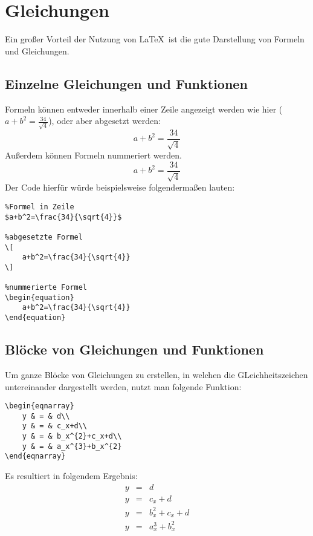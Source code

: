 
\chapter{Gleichungen}
Ein großer Vorteil der Nutzung von \LaTeX\ ist die gute Darstellung von Formeln und Gleichungen. 
\section{Einzelne Gleichungen und Funktionen}
Formeln können entweder innerhalb einer Zeile angezeigt werden wie hier ($a+b^2=\frac{34}{\sqrt{4}}$), oder aber abgesetzt werden:
\[
    a+b^2=\frac{34}{\sqrt{4}}
\]
Außerdem können Formeln nummeriert werden.
\begin{equation}
    a+b^2=\frac{34}{\sqrt{4}}
\end{equation}
Der Code hierfür würde beispielsweise folgendermaßen lauten:
\begin{lstlisting}
%Formel in Zeile
$a+b^2=\frac{34}{\sqrt{4}}$

%abgesetzte Formel
\[
    a+b^2=\frac{34}{\sqrt{4}}
\]

%nummerierte Formel
\begin{equation}
    a+b^2=\frac{34}{\sqrt{4}}
\end{equation}
\end{lstlisting}

\section{Blöcke von Gleichungen und Funktionen}
Um ganze Blöcke von Gleichungen zu erstellen, in welchen die GLeichheitszeichen untereinander dargestellt werden, nutzt man folgende Funktion:

\begin{lstlisting}
\begin{eqnarray}
    y & = & d\\
    y & = & c_x+d\\
    y & = & b_x^{2}+c_x+d\\
    y & = & a_x^{3}+b_x^{2}
\end{eqnarray}
\end{lstlisting}
Es resultiert in folgendem Ergebnis:
\begin{eqnarray}
    y & = & d\\
    y & = & c_x+d\\
    y & = & b_x^{2}+c_x+d\\
    y & = & a_x^{3}+b_x^{2}
\end{eqnarray}

